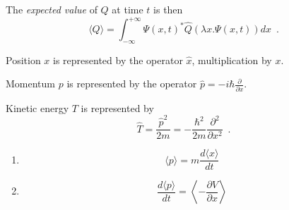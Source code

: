 The \emph{expected value} of $Q$ at time $t$ is then
\[ \langle Q \rangle = \int_{-\infty}^{+ \infty} \Psi(x,t)^* \hat{Q}(\lambda x. \Psi(x,t)) dx \enspace . \]

Position $x$ is represented by the operator $\hat{x}$, multiplication by $x$.

Momentum $p$ is represented by the operator $\hat{p} = - i \hbar \frac{\partial}{\partial x}$.

Kinetic energy $T$ is represented by
\[ \hat{T} = \frac{\hat{p}^2}{2m} = - \frac{\hbar^2}{2m} \frac{\partial^2}{\partial x^2} \enspace . \]

\begin{prop}
\begin{enumerate}
\item \[ \langle p \rangle = m \frac{d \langle x \rangle}{dt} \]
\item \[ \frac{d \langle p \rangle}{dt} = \left\langle - \frac{\partial V}{\partial x} \right\rangle \]
\end{enumerate}
\end{prop}

